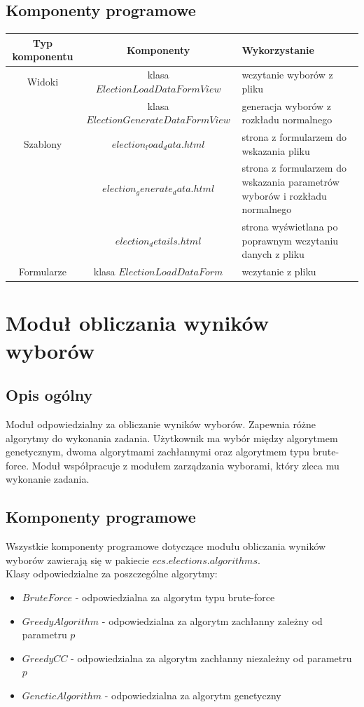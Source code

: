 \documentclass[pdflatex,11pt]{../aghdoc_version2}
\begin{document}
\subsection{Komponenty programowe}
\begin{tabular}{|c|c|p{5cm}|}
\hline 
\textbf{Typ komponentu} & \textbf{Komponenty} & \textbf{Wykorzystanie} \\ 
\hline 
Widoki & klasa $ElectionLoadDataFormView$ & wczytanie wyborów z pliku \\ 
\cline{2-3} 
 & klasa
$ElectionGenerateDataFormView$ & generacja wyborów z rozkładu
normalnego \\ 
\hline 
Szablony & $election_load_data.html$ & strona z formularzem do
wskazania pliku \\ 
\cline{2-3} 
 & $election_generate_data.html$ & strona z formularzem do
wskazania parametrów wyborów i
rozkładu normalnego \\ 
\cline{2-3} 
 & $election_details.html$ & strona wyświetlana po
poprawnym wczytaniu danych z
pliku \\ 
\hline 
Formularze & klasa $ElectionLoadDataForm$ & wczytanie z pliku \\ 
\hline 
\end{tabular} 

\section{Moduł obliczania wyników wyborów}
\subsection{Opis ogólny}
Moduł odpowiedzialny za obliczanie wyników wyborów. Zapewnia różne algorytmy do
wykonania zadania. Użytkownik ma wybór między algorytmem genetycznym, dwoma
algorytmami zachłannymi oraz algorytmem typu brute-force. Moduł współpracuje z modułem
zarządzania wyborami, który zleca mu wykonanie zadania.
\subsection{Komponenty programowe}
Wszystkie komponenty programowe dotyczące modułu obliczania wyników wyborów
zawierają się w pakiecie $ecs.elections.algorithms$. \\
Klasy odpowiedzialne za poszczególne algorytmy:
\begin{itemize}
\item $BruteForce$ - odpowiedzialna za algorytm typu brute-force
\item $GreedyAlgorithm$ - odpowiedzialna za algorytm zachłanny zależny od parametru $p$
\item $GreedyCC$ - odpowiedzialna za algorytm zachłanny niezależny od parametru $p$
\item $GeneticAlgorithm$ - odpowiedzialna za algorytm genetyczny
\end{itemize}
\end{document}
